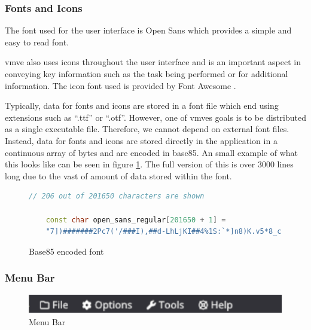 \documentclass[11pt]{article}
\begin{document}
\subsubsection{Fonts and Icons}
The font used for the user interface is Open Sans which provides a simple and
easy to read font.

\gls{vmve} also uses icons throughout the user interface and is an important
aspect in conveying key information such as the task being performed or for
additional information. The icon font used is provided by Font Awesome
\cite{font-awesome}.

Typically, data for fonts and icons are stored in a font file which end using
extensions such as ``.ttf'' or ``.otf''. However, one of \glspl{vmve} goals is
to be distributed as a single executable file. Therefore, we cannot depend on
external font files. Instead, data for fonts and icons are stored directly in
the application in a continuous array of bytes and are encoded in base85. An
small example of what this looks like can be seen in figure
\ref{fig:base85_font}. The full version of this is over 3000 lines long due to
the vast of amount of data stored within the font.

\begin{figure}[h!]
  \centering
  \begin{lstlisting}[language=C++]
    // 206 out of 201650 characters are shown

    const char open_sans_regular[201650 + 1] =
    "7])#######2Pc7('/###I),##d-LhLjKI##4%1S:`*]n8)K.v5*8_c)iZ;99=$$$$c(m]4pKdp/(RdL<snZo'oI,hLNDnx4Uu/>8Q7oo^eFb3hB4JYc'Tx-3l_wgd2Tf._r+&sAqV,-G"":F8LD=5,n]A&aA+<gXG-<iobW&>$>QJ8Z.W$jg0Fv-o^(^JJnf4T"
  \end{lstlisting}
  \caption{Base85 encoded font}
  \label{fig:base85_font}
\end{figure}

\subsubsection{Menu Bar}

\begin{figure}[h!]
  \centering
  \includegraphics[width=\textwidth]{images/menu_bar.png}
  \caption{Menu Bar}
  \label{fig:menu_bar}
\end{figure}
\end{document}
